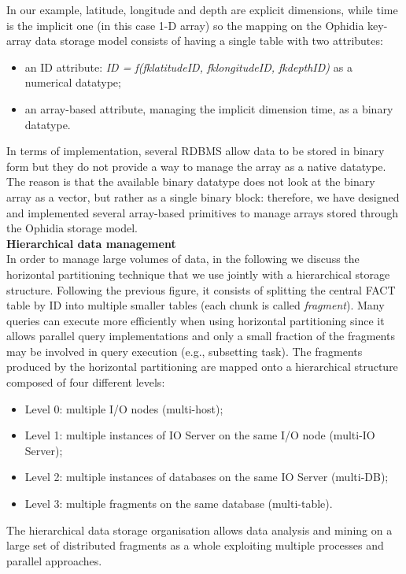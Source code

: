 In our example, latitude, longitude and depth are explicit dimensions, while time is the implicit one (in this case 1-D array) so the mapping on the Ophidia key-array data storage model consists of having a single table with two attributes:
\begin{itemize}
	\item an ID attribute: \textit{ID = f(fk\textunderscore latitudeID, fk\textunderscore longitudeID, fk\textunderscore depthID)} as a numerical datatype;
	\item an array-based attribute, managing the implicit dimension time, as a binary datatype.
\end{itemize}
In terms of implementation, several RDBMS allow data to be stored in binary form but they do not provide a way to manage the array as a native datatype. The reason is that the available binary datatype does not look at the binary array as a vector, but rather as a single binary block: therefore, we have designed and implemented several array-based primitives to manage arrays stored through the Ophidia storage model.\\

\textbf{Hierarchical data management}\\

In order to manage large volumes of data, in the following we discuss the horizontal partitioning technique that we use jointly with a hierarchical storage structure. Following the previous figure, it consists of splitting the central FACT table by ID into multiple smaller tables (each chunk is called \textit{fragment}). Many queries can execute more efficiently when using horizontal partitioning since it allows parallel query implementations and only a small fraction of the fragments may be involved in query execution (e.g., subsetting task). The fragments produced by the horizontal partitioning are mapped onto a hierarchical structure composed of four different levels:
\begin{itemize}
	\item Level 0: multiple I/O nodes (multi-host);
	\item Level 1: multiple instances of IO Server on the same I/O node (multi-IO Server);
	\item Level 2: multiple instances of databases on the same IO Server (multi-DB);
	\item Level 3: multiple fragments on the same database (multi-table).
\end{itemize}
The hierarchical data storage organisation allows data analysis and mining on a large set of distributed fragments as a whole exploiting multiple processes and parallel approaches.

